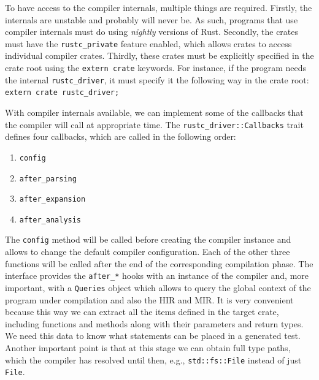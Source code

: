 \documentclass{article}
\begin{document}
To have access to the compiler internals, multiple things are required. Firstly, the internals are unstable and probably will never be. As such, programs that use compiler internals must do using \textit{nightly} versions of Rust. Secondly, the crates must have the \lstinline{rustc_private} feature enabled, which allows crates to access individual compiler crates. Thirdly, these crates must be explicitly specified in the crate root using the \lstinline{extern crate} keywords. For instance, if the program needs the internal \lstinline{rustc_driver}, it must specify it the following way in the crate root: \lstinline{extern crate rustc_driver;} 

With compiler internals available, we can implement some of the callbacks that the compiler will call at appropriate time. The \lstinline{rustc_driver::Callbacks} trait defines four callbacks, which are called in the following order:
\begin{enumerate}
    \item \lstinline{config}
    \item \lstinline{after_parsing}
    \item \lstinline{after_expansion}
    \item \lstinline{after_analysis}
\end{enumerate}

The \lstinline{config} method will be called before creating the compiler instance and allows to change the default compiler configuration. Each of the other three functions will be called after the end of the corresponding compilation phase. The interface provides the \lstinline{after_*} hooks with an instance of the compiler and, more important, with a \lstinline{Queries} object which allows to query the global context of the program under compilation and also the \ac{HIR} and \ac{MIR}. It is very convenient because this way we can extract all the items defined in the target crate, including functions and methods along with their parameters and return types. We need this data to know what statements can be placed in a generated test. Another important point is that at this stage we can obtain full type paths, which the compiler has resolved until then, e.g., \lstinline{std::fs::File} instead of just \lstinline{File}.
\end{document}
